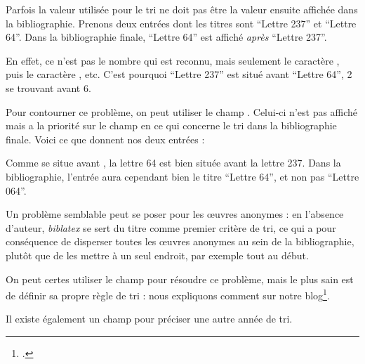 \begin{latexcode}
\usepackage[sorting=nyt]{biblatex}
\end{latexcode}

Parfois   la valeur utilisée pour le tri ne doit pas être la valeur ensuite affichée dans la bibliographie. Prenons deux entrées dont les titres sont \enquote{Lettre 237} et \enquote{Lettre 64}. Dans la bibliographie finale,
\enquote{Lettre 64} est affiché \emph{après} \enquote{Lettre 237}. 

En effet, ce n'est pas le nombre  qui est reconnu, mais seulement le caractère , puis le caractère , etc. C'est pourquoi \enquote{Lettre 237} est situé avant \enquote{Lettre 64}, 2 se trouvant avant 6.

Pour contourner ce problème, on peut utiliser le champ . Celui-ci n'est pas affiché mais a la priorité sur le  champ  en ce qui concerne le tri dans la bibliographie finale.  Voici ce que donnent nos deux entrées :

\begin{latexcode}
@book{AugustinEpi64,
    Author = {Augustin},
    Sorttitle = {Lettre 064},
    Title = {Lettre 64}}
    
@book{AugustinEpi237,
    Author = {Augustin},
    Sorttitle = {Lettre 237},
    Title = {Lettre 237},
\end{latexcode}

Comme  se situe avant , la lettre 64 est bien située avant la lettre 237. Dans la bibliographie, l'entrée aura cependant bien le titre  \enquote{Lettre 64}, et non pas \enquote{Lettre 064}.

\begin{attention}
Un problème semblable peut se poser pour les œuvres anonymes : en l'absence d'auteur, \emph{biblatex} se sert du titre comme premier critère de tri, ce qui a pour conséquence de disperser toutes les œuvres anonymes au sein de la bibliographie, plutôt que de les mettre à un seul endroit, par exemple tout au début.

On peut certes utiliser le champ  pour résoudre ce problème, mais le plus sain est de définir sa propre règle de tri : nous expliquons comment sur notre blog\footcite{trianonymes}.
\end{attention}


Il existe également un champ  pour préciser une autre année de tri. 
